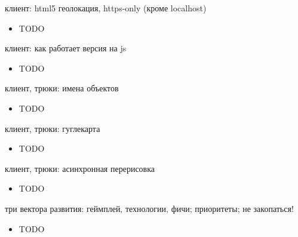 \documentclass[aspectratio=169,handout,bigger]{beamer}
\begin{document}

\begin{frame}{клиент: html5 геолокация, https-only (кроме localhost)}
  \begin{itemize}
    \item TODO
  \end{itemize}
\end{frame}


\begin{frame}{клиент: как работает версия на js}
  \begin{itemize}
    \item TODO
  \end{itemize}
\end{frame}


\begin{frame}{клиент, трюки: имена объектов}
  \begin{itemize}
    \item TODO
  \end{itemize}
\end{frame}


\begin{frame}{клиент, трюки: гуглекарта}
  \begin{itemize}
    \item TODO
  \end{itemize}
\end{frame}


\begin{frame}{клиент, трюки: асинхронная перерисовка}
  \begin{itemize}
    \item TODO
  \end{itemize}
\end{frame}


\begin{frame}{три вектора развития: геймплей, технологии, фичи; приоритеты; не закопаться!}
  \begin{itemize}
    \item TODO
  \end{itemize}
\end{frame}
\end{document}

